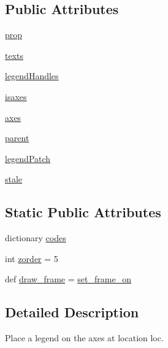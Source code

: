 \subsection*{Public Attributes}
\begin{DoxyCompactItemize}
\item 
\hyperlink{classmatplotlib_1_1legend_1_1Legend_ad10de5167a28d5cccf4cdd2f965d0d19}{prop}
\item 
\hyperlink{classmatplotlib_1_1legend_1_1Legend_aeb384da19f0360018dcd0bce638e8d8e}{texts}
\item 
\hyperlink{classmatplotlib_1_1legend_1_1Legend_afe008e6218bc940f30861e1065c9db73}{legend\+Handles}
\item 
\hyperlink{classmatplotlib_1_1legend_1_1Legend_ad76b985cb14e8fb5ffdb88abbd5a46cf}{isaxes}
\item 
\hyperlink{classmatplotlib_1_1legend_1_1Legend_a6d5b077598377c37b81678239f12a67a}{axes}
\item 
\hyperlink{classmatplotlib_1_1legend_1_1Legend_a744a99b8175ca5a486cdf0602d3ad20b}{parent}
\item 
\hyperlink{classmatplotlib_1_1legend_1_1Legend_a5efd848358e242750a46c8eba6eada49}{legend\+Patch}
\item 
\hyperlink{classmatplotlib_1_1legend_1_1Legend_aee56d3a3b24ef659c9e6d4a76022c857}{stale}
\end{DoxyCompactItemize}
\subsection*{Static Public Attributes}
\begin{DoxyCompactItemize}
\item 
dictionary \hyperlink{classmatplotlib_1_1legend_1_1Legend_aeded78405dd0fd042071f872293ea488}{codes}
\item 
int \hyperlink{classmatplotlib_1_1legend_1_1Legend_ac0d738fd956dde1a861307094b44aac9}{zorder} = 5
\item 
def \hyperlink{classmatplotlib_1_1legend_1_1Legend_a880b57adba17c094f0b4a9aa3fc363e4}{draw\+\_\+frame} = \hyperlink{classmatplotlib_1_1legend_1_1Legend_a5cec6b9dea722d9167b810f347ee0242}{set\+\_\+frame\+\_\+on}
\end{DoxyCompactItemize}


\subsection{Detailed Description}
\begin{DoxyVerb}Place a legend on the axes at location loc.\end{DoxyVerb}
 

